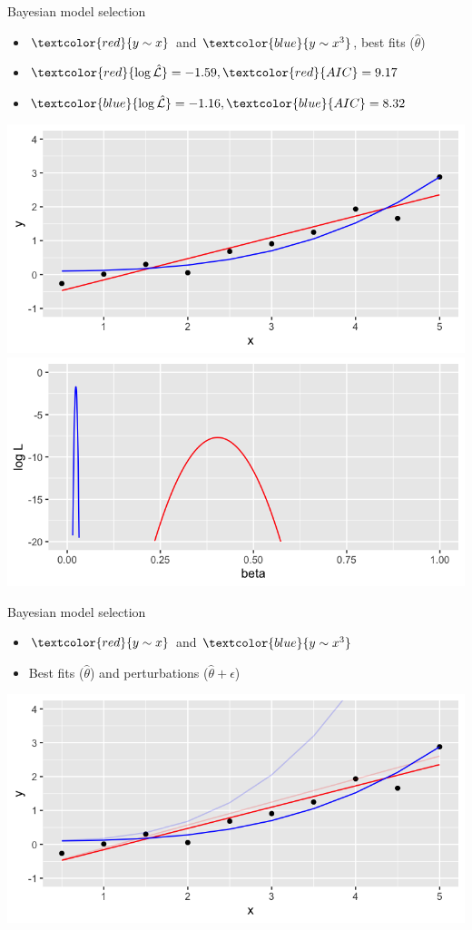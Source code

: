\documentclass[10pt]{beamer}
\begin{document}
\begin{frame}{Bayesian model selection}
  \begin{itemize}
    \item  $\textcolor{red}{y \sim x}$ and $\textcolor{blue}{y \sim x^3}$, best fits ($\hat{\theta}$)
    \item $\textcolor{red}{\log \hat{\mathcal{L}}} = -1.59, \textcolor{red}{AIC} = 9.17$
      \item $\textcolor{blue}{\log \hat{\mathcal{L}}} = -1.16, \textcolor{blue}{AIC} = 8.32$
      \end{itemize}
 \includegraphics[width=.45\textwidth]{cedas-bayes-mod-2.png} \includegraphics[width=.45\textwidth]{cedas-bayes-peaks.png}
\end{frame}

\begin{frame}{Bayesian model selection}
  \begin{itemize}
    \item  $\textcolor{red}{y \sim x}$ and $\textcolor{blue}{y \sim x^3}$
    \item Best fits ($\hat{\theta}$) and perturbations ($\hat{\theta} + \epsilon$)
      \end{itemize}  
 \includegraphics[width=\textwidth]{cedas-bayes-mod-3.png}
\end{frame}
\end{document}
